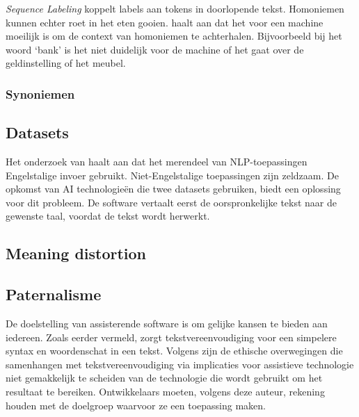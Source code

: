 \textit{Sequence Labeling} koppelt labels aan tokens in doorlopende tekst. Homoniemen kunnen echter roet in het eten gooien. \textcite{Roldos2020} haalt aan dat het voor een machine moeilijk is om de context van homoniemen te achterhalen. Bijvoorbeeld bij het woord ‘bank’ is het niet duidelijk voor de machine of het gaat over de geldinstelling of het meubel. 

\subsubsection{Synoniemen}



\subsection{Datasets}

Het onderzoek van \textcite{Sciforce2020} haalt aan dat het merendeel van NLP-toepassingen Engelstalige invoer gebruikt. Niet-Engelstalige toepassingen zijn zeldzaam. De opkomst van AI technologieën die twee datasets gebruiken, biedt een oplossing voor dit probleem. De software vertaalt eerst de oorspronkelijke tekst naar de gewenste taal, voordat de tekst wordt herwerkt. 


\subsection{Meaning distortion}



\subsection{Paternalisme}

De doelstelling van assisterende software is om gelijke kansen te bieden aan iedereen. Zoals eerder vermeld, zorgt tekstvereenvoudiging voor een simpelere syntax en woordenschat in een tekst. Volgens \textcite{Niemeijer2010} zijn de ethische overwegingen die samenhangen met tekstvereenvoudiging via implicaties voor assistieve technologie niet gemakkelijk te scheiden van de technologie die wordt gebruikt om het resultaat te bereiken. Ontwikkelaars moeten, volgens deze auteur, rekening houden met de doelgroep waarvoor ze een toepassing maken.

